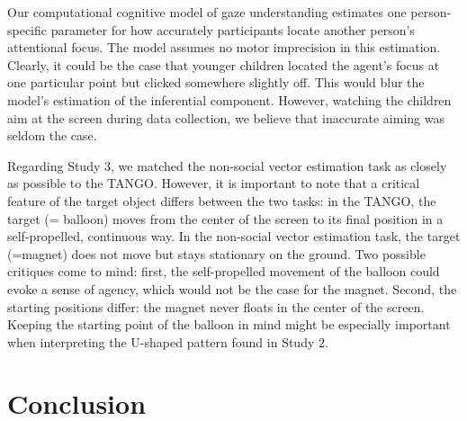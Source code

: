 \documentclass[
  man,mask,floatsintext]{apa6}
\begin{document}
Our computational cognitive model of gaze understanding estimates one person-specific parameter for how accurately participants locate another person's attentional focus. The model assumes no motor imprecision in this estimation. Clearly, it could be the case that younger children located the agent's focus at one particular point but clicked somewhere slightly off. This would blur the model's estimation of the inferential component. However, watching the children aim at the screen during data collection, we believe that inaccurate aiming was seldom the case.

Regarding Study 3, we matched the non-social vector estimation task as closely as possible to the TANGO. However, it is important to note that a critical feature of the target object differs between the two tasks: in the TANGO, the target (= balloon) moves from the center of the screen to its final position in a self-propelled, continuous way. In the non-social vector estimation task, the target (=magnet) does not move but stays stationary on the ground. Two possible critiques come to mind: first, the self-propelled movement of the balloon could evoke a sense of agency, which would not be the case for the magnet. Second, the starting positions differ: the magnet never floats in the center of the screen. Keeping the starting point of the balloon in mind might be especially important when interpreting the U-shaped pattern found in Study 2.

\hypertarget{conclusion}{%
\section{Conclusion}\label{conclusion}}
\end{document}
